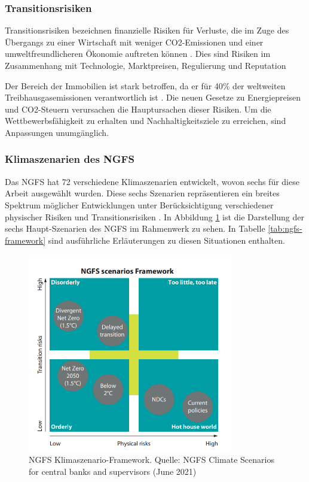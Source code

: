 \subsubsection{Transitionsrisiken}
Transitionsrisiken bezeichnen finanzielle Risiken für Verluste, die im Zuge des Übergangs zu einer Wirtschaft mit weniger CO2-Emissionen und einer umweltfreundlicheren Ökonomie auftreten können \parencite{ecb2020climate}. Dies sind Risiken im Zusammenhang mit Technologie, Marktpreisen, Regulierung und Reputation

Der Bereich der Immobilien ist stark betroffen, da er für 40\% der weltweiten Treibhausgasemissionen verantwortlich ist \parencite{unepfi2023realestate}. Die neuen Gesetze zu Energiepreisen und CO2-Steuern verursachen die Hauptursachen dieser Risiken. Um die Wettbewerbsfähigkeit zu erhalten und Nachhaltigkeitsziele zu erreichen, sind Anpassungen unumgänglich.


\subsubsection{Klimaszenarien des NGFS}
Das \ac{NGFS} hat 72 verschiedene Klimaszenarien entwickelt, wovon sechs für diese Arbeit ausgewählt wurden. Diese sechs Szenarien repräsentieren ein breites Spektrum möglicher Entwicklungen unter Berücksichtigung verschiedener physischer Risiken und Transitionsrisiken \parencite{NGFS2021}. In Abbildung \ref{fig:ngfs} ist die Darstellung der sechs Haupt-Szenarien des NGFS im Rahmenwerk zu sehen. In Tabelle \ref{tab:ngfs-framework} sind ausführliche Erläuterungen zu diesen Situationen enthalten.

\begin{figure}[htbp]
    \centering
    \includegraphics[width=0.8\textwidth]{figures/NGFS.png}
    \caption{NGFS Klimaszenario-Framework. Quelle: NGFS Climate Scenarios for central banks and supervisors (June 2021)}
    \label{fig:ngfs}
\end{figure}
\FloatBarrier

